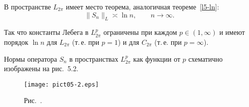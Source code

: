 В пространстве {$L_{2\pi}$} имеет место теорема, аналогичная {теореме~\ref{l5-ln}}:
$$ \|{S}_n\|_L \asymp \ln n,\qquad n\to \infty.$$

Так что константы Лебега в {$L^p_{2\pi}$} ограничены при каждом
$p\in (1,\infty)$ и имеют порядок $\ln n$ для {$L_{2\pi}$} (т.\,е. при
$p=1$) и для {$C_{2\pi}$} (т.\,е. при $p=\infty$).

Нормы оператора $S_n$  в пространствах $L^p_{2\pi}$ как
функции от $p$ схематично изображены на рис.~5.2.

\begin{figure}[ht]
\begin{center}
\texttt{[image: pict05-2.eps]}
\end{center}
 \bigskip
 \label{r5-2}

 \centerline{Рис.~\theris. }
 \bigskip
\end{figure}




